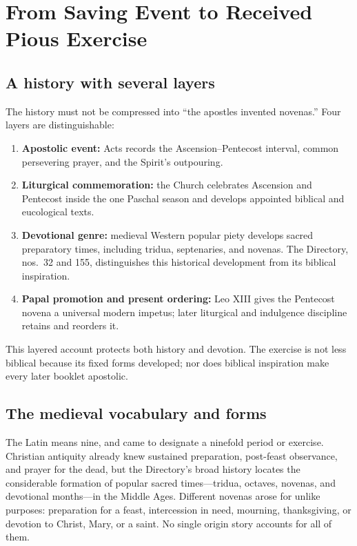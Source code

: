 \section{From Saving Event to Received Pious Exercise}

\subsection{A history with several layers}

The history must not be compressed into “the apostles invented novenas.” Four layers are distinguishable:

\begin{enumerate}
\item \textbf{Apostolic event:} Acts records the Ascension--Pentecost interval, common persevering prayer, and the Spirit's outpouring.
\item \textbf{Liturgical commemoration:} the Church celebrates Ascension and Pentecost inside the one Paschal season and develops appointed biblical and eucological texts.
\item \textbf{Devotional genre:} medieval Western popular piety develops sacred preparatory times, including tridua, septenaries, and novenas. The Directory, nos.~32 and 155, distinguishes this historical development from its biblical inspiration.
\item \textbf{Papal promotion and present ordering:} Leo XIII gives the Pentecost novena a universal modern impetus; later liturgical and indulgence discipline retains and reorders it.
\end{enumerate}

This layered account protects both history and devotion. The exercise is not less biblical because its fixed forms developed; nor does biblical inspiration make every later booklet apostolic.

\subsection{The medieval vocabulary and forms}

The Latin  means nine, and  came to designate a ninefold period or exercise. Christian antiquity already knew sustained preparation, post-feast observance, and prayer for the dead, but the Directory's broad history locates the considerable formation of popular sacred times---tridua, octaves, novenas, and devotional months---in the Middle Ages. Different novenas arose for unlike purposes: preparation for a feast, intercession in need, mourning, thanksgiving, or devotion to Christ, Mary, or a saint. No single origin story accounts for all of them.

